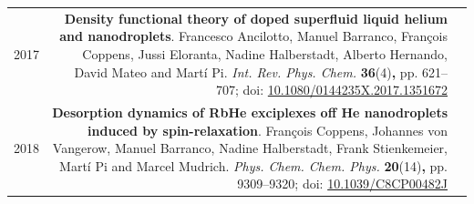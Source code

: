 \begin{tabular}{l!{\VRule}Rc}
	2017 & \textbf{Density functional theory of doped superfluid liquid helium and nanodroplets}. Francesco Ancilotto, Manuel Barranco, Fran\c{c}ois Coppens, Jussi Eloranta, Nadine Halberstadt, Alberto Hernando, David Mateo and Mart\'{i} Pi. \emph{Int. Rev. Phys. Chem.} \textbf{36}(4)\textbf{,} pp. 621--707; doi: \href{http://dx.doi.org/10.1080/0144235X.2017.1351672}{10.1080/0144235X.2017.1351672}&\vspace{20pt}\\
	2018 & \textbf{Desorption dynamics of RbHe exciplexes off He nanodroplets induced by spin-relaxation}. Fran\c{c}ois Coppens, Johannes von Vangerow, Manuel Barranco, Nadine Halberstadt, Frank Stienkemeier, Mart\'{i} Pi and Marcel Mudrich. \emph{Phys. Chem. Chem. Phys.} \textbf{20}(14)\textbf{,} pp. 9309--9320; doi: \href{http://dx.doi.org/10.1039/C8CP00482J}{10.1039/C8CP00482J}&
\end{tabular}